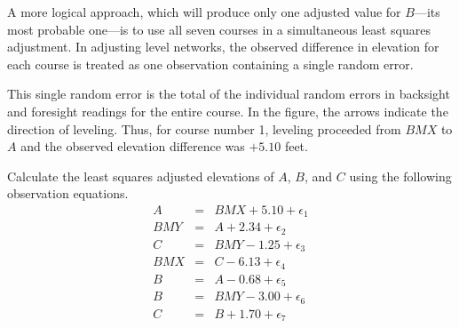 \documentclass[11pt]{article}
\begin{document}
  A more logical approach, which will produce only one adjusted value
  for $B$---its most probable one---is to use all seven courses in a
  simultaneous least squares adjustment. In adjusting level networks,
  the observed difference in elevation for each course is treated as
  one observation containing a single random error.

  This single random error is the total of the individual random
  errors in backsight and foresight readings for the entire course. In
  the figure, the arrows indicate the direction of leveling. Thus, for
  course number 1, leveling proceeded from $BMX$ to $A$ and the observed
  elevation difference was $+5.10$ feet.

Calculate the least squares
  adjusted elevations of $A$, $B$, and $C$ using the following
  observation equations.
  \begin{equation}
    \label{eq:aelaeghu}
    \begin{array}{rcl}
      A&=&BMX+5.10+\epsilon_{1} \\
      BMY&=&A+2.34+\epsilon_{2} \\
      C&=&BMY-1.25+\epsilon_{3} \\
      BMX&=&C-6.13+\epsilon_{4} \\
      B&=&A-0.68+\epsilon_{5} \\
      B&=&BMY-3.00+\epsilon_{6} \\
      C&=&B+1.70+\epsilon_{7}
    \end{array}
  \end{equation}
\end{document}
